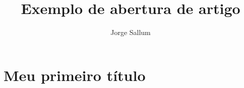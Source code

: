 \documentclass{memoir}
\title{Exemplo de abertura de artigo}
\author{Jorge Sallum}
\begin{document}
 

\maketitle
 

\chapter*{Meu primeiro título}

\lipsum


 
\end{document}
